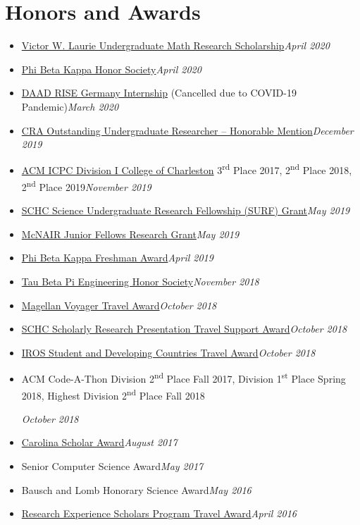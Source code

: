 \documentclass[\ifdefined\cv10pt\else11pt\fi,letterpaper]{moderncv}
\newcommand{\cvonly}[1]{\ifdefined\cv#1\fi\ignorespaces}
\renewcommand{\cvitem}[2]{\item {#1}\hfill\textit{#2}}
\newcommand{\st}{\textsuperscript{st}\xspace}
\newcommand{\nd}{\textsuperscript{nd}\xspace}
\newcommand{\rd}{\textsuperscript{rd}\xspace}
\let\oldsection\section
\renewcommand{\section}[1]{\vspace*{-1.3ex}\oldsection{#1}\vspace*{-0.5ex}}
\begin{document}
	\section{Honors and Awards}
	\begin{itemize}
		\cvitem{\href{https://sc.edu/study/colleges_schools/artsandsciences/mathematics/study/awards_scholarships/}{Victor W. Laurie Undergraduate Math Research Scholarship}}{April 2020}
		\cvitem{\href{https://www.pbk.org/}{Phi Beta Kappa Honor Society}}{April 2020}
		\cvitem{\href{https://www.daad.de/rise/en/rise-germany/}{DAAD RISE Germany Internship} (Cancelled due to COVID-19 Pandemic)}{March 2020}
		\cvitem{\href{https://cra.org/about/awards/outstanding-undergraduate-researcher-award/}{CRA Outstanding Undergraduate Researcher -- Honorable Mention}}{December 2019}  %
		\cvonly{\cvitem{\href{http://compsci.cofc.edu/ACM-ICPC.php}{ACM ICPC Division I College of Charleston} 3\rd Place 2017, 2\nd Place 2018, 2\nd Place 2019}{November 2019}}
		\cvitem{\href{https://www.sc.edu/study/colleges_schools/honors_college/internal/beyond_the_classroom/undergraduate_research/surf_and_exploration_grants/index.php}{SCHC Science Undergraduate Research Fellowship (SURF) Grant}}{May 2019}
		\cvitem{\href{https://sc.edu/about/offices_and_divisions/undergraduate_research/apply_for_funding/other_money_opportunities/cec_mcnair-research-fellows-summer/index.php}{McNAIR Junior Fellows Research Grant}}{May 2019}  %
		\cvitem{\href{https://www.sc.edu/uofsc/announcements/posts/2019/04/university_awards_day_2019.php}{Phi Beta Kappa Freshman Award}}{April 2019}
		\cvitem{\href{https://tbp.org/}{Tau Beta Pi Engineering Honor Society}}{November 2018}
		\cvonly{
			\cvitem{\href{https://www.sc.edu/about/offices_and_divisions/undergraduate_research/apply_for_funding/our_funding/conference-travel/index.php}{Magellan Voyager Travel Award}}{October 2018}
			\cvitem{\href{https://www.sc.edu/study/colleges_schools/honors_college/experience/undergraduate_research/index.php}{SCHC Scholarly Research Presentation Travel Support Award}}{October 2018}
			\cvitem{\href{https://www.iros2018.org/travel-grants}{IROS Student and Developing Countries Travel Award}}{October 2018}
		}
		\cvonly{\cvitem{\parbox[t]{0.75\linewidth}{ACM Code-A-Thon Division 2\nd Place Fall 2017, Division 1\st Place Spring 2018, Highest Division 2\nd Place Fall 2018}\vspace*{0.6ex}}{October 2018}}
		\cvitem{\href{https://sc.edu/about/offices_and_divisions/undergraduate_admissions/honors_and_scholars_programs/top_scholars/}{Carolina Scholar Award}}{August 2017}
		\cvonly{\cvitem{Senior Computer Science Award}{May 2017}}
		\cvonly{\cvitem{Bausch and Lomb Honorary Science Award}{May 2016}}
		\cvonly{\cvitem{\href{https://www.scgssm.org/residential/academics/senior-research}{Research Experience Scholars Program Travel Award}}{April 2016}}
	\end{itemize}
	
\end{document}
